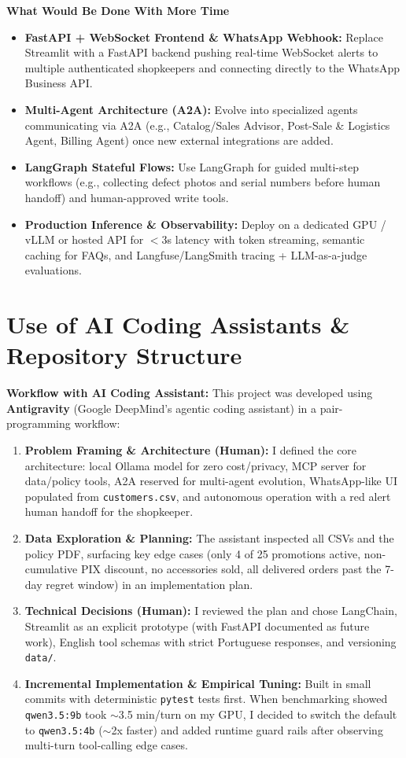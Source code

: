 \documentclass[11pt,a4paper]{article}
\begin{document}
\textbf{What Would Be Done With More Time}
\begin{itemize}
    \item \textbf{FastAPI + WebSocket Frontend \& WhatsApp Webhook:} Replace Streamlit with a FastAPI backend pushing real-time WebSocket alerts to multiple authenticated shopkeepers and connecting directly to the WhatsApp Business API.
    \item \textbf{Multi-Agent Architecture (A2A):} Evolve into specialized agents communicating via A2A (e.g., Catalog/Sales Advisor, Post-Sale \& Logistics Agent, Billing Agent) once new external integrations are added.
    \item \textbf{LangGraph Stateful Flows:} Use LangGraph for guided multi-step workflows (e.g., collecting defect photos and serial numbers before human handoff) and human-approved write tools.
    \item \textbf{Production Inference \& Observability:} Deploy on a dedicated GPU / vLLM or hosted API for $<3$s latency with token streaming, semantic caching for FAQs, and Langfuse/LangSmith tracing + LLM-as-a-judge evaluations.
\end{itemize}

\section{Use of AI Coding Assistants \& Repository Structure}

\textbf{Workflow with AI Coding Assistant:} This project was developed using \textbf{Antigravity} (Google DeepMind's agentic coding assistant) in a pair-programming workflow:
\begin{enumerate}
    \item \textbf{Problem Framing \& Architecture (Human):} I defined the core architecture: local Ollama model for zero cost/privacy, MCP server for data/policy tools, A2A reserved for multi-agent evolution, WhatsApp-like UI populated from \texttt{customers.csv}, and autonomous operation with a red alert human handoff for the shopkeeper.
    \item \textbf{Data Exploration \& Planning:} The assistant inspected all CSVs and the policy PDF, surfacing key edge cases (only 4 of 25 promotions active, non-cumulative PIX discount, no accessories sold, all delivered orders past the 7-day regret window) in an implementation plan.
    \item \textbf{Technical Decisions (Human):} I reviewed the plan and chose LangChain, Streamlit as an explicit prototype (with FastAPI documented as future work), English tool schemas with strict Portuguese responses, and versioning \texttt{data/}.
    \item \textbf{Incremental Implementation \& Empirical Tuning:} Built in small commits with deterministic \texttt{pytest} tests first. When benchmarking showed \texttt{qwen3.5:9b} took $\sim$3.5 min/turn on my GPU, I decided to switch the default to \texttt{qwen3.5:4b} ($\sim$2x faster) and added runtime guard rails after observing multi-turn tool-calling edge cases.
\end{enumerate}
\end{document}
